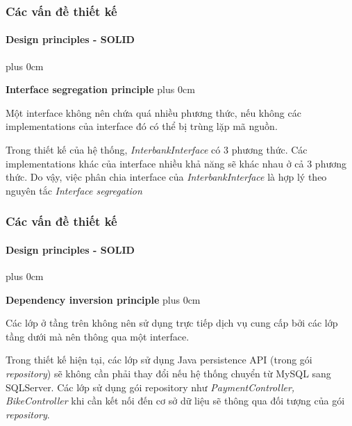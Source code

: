 \documentclass[11pt]{beamer}
\renewcommand{\raggedright}{\leftskip=0pt \rightskip=0pt plus 0cm}
\let\olditemize=\itemize
\renewenvironment{itemize}{\olditemize\raggedright}{\endlist}
\begin{document}
\begin{frame}[plain]
	\frametitle{Các vấn đề thiết kế}
	\framesubtitle{Design principles - SOLID}
	\begin{itemize}
		\item \textbf{Interface segregation principle}
		\begin{itemize}
			\item Một interface không nên chứa quá nhiều phương thức, nếu không các implementations của interface đó có thể bị trùng lặp mã nguồn.\\[5pt]
			\item Trong thiết kế của hệ thống, \textit{InterbankInterface} có 3 phương thức. Các implementations khác của interface nhiều khả năng sẽ khác nhau ở cả 3 phương thức. Do vậy, việc phân chia interface của \textit{InterbankInterface} là hợp lý theo nguyên tắc \textit{Interface segregation}\\[5pt]
		\end{itemize}
	\end{itemize}
\end{frame}
\begin{frame}[plain]
	\frametitle{Các vấn đề thiết kế}
	\framesubtitle{Design principles - SOLID}
	\begin{itemize}
		\item \textbf{Dependency inversion principle}
		\begin{itemize}
			\item Các lớp ở tầng trên không nên sử dụng trực tiếp dịch vụ cung cấp bởi các lớp tầng dưới mà nên thông qua một interface.\\[5pt]
			\item Trong thiết kế hiện tại, các lớp sử dụng Java persistence API (trong gói \textit{repository}) sẽ không cần phải thay đổi nếu hệ thống chuyển từ MySQL sang SQLServer. Các lớp sử dụng gói repository như \textit{PaymentController, BikeController} khi cần kết nối đến cơ sở dữ liệu sẽ thông qua đối tượng của gói \textit{repository}.\\[5pt]
		\end{itemize}
	\end{itemize}
\end{frame}
\end{document}
